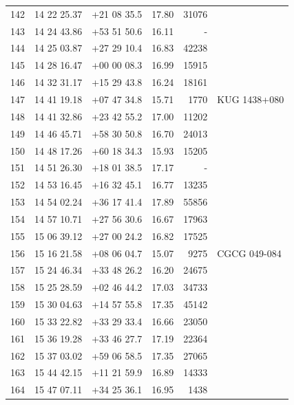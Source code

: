 \documentclass[useAMS,usenatbib]{mn2e}
\begin{document}
\begin{table}
\begin{tabular}{rrrlrl}
 142 &  14 22 25.37 & +21 08 35.5 &  17.80 &  31076 &                  \\
 143 &  14 24 43.86 & +53 51 50.6 &  16.11 &      - &                  \\
 144 &  14 25 03.87 & +27 29 10.4 &  16.83 &  42238 &                  \\
 145 &  14 28 16.47 & +00 00 08.3 &  16.99 &  15915 &                  \\
 146 &  14 32 31.17 & +15 29 43.8 &  16.24 &  18161 &                  \\
 147 &  14 41 19.18 & +07 47 34.8 &  15.71 &   1770 &    KUG 1438+080  \\
 148 &  14 41 32.86 & +23 42 55.2 &  17.00 &  11202 &                  \\
 149 &  14 46 45.71 & +58 30 50.8 &  16.70 &  24013 &                  \\
 150 &  14 48 17.26 & +60 18 34.3 &  15.93 &  15205 &                  \\
 151 &  14 51 26.30 & +18 01 38.5 &  17.17 &     -  &                  \\
 152 &  14 53 16.45 & +16 32 45.1 &  16.77 &  13235 &                  \\
 153 &  14 54 02.24 & +36 17 41.4 &  17.89 &  55856 &                  \\
 154 &  14 57 10.71 & +27 56 30.6 &  16.67 &  17963 &                  \\
 155 &  15 06 39.12 & +27 00 24.2 &  16.82 &  17525 &                  \\
 156 &  15 16 21.58 & +08 06 04.7 &  15.07 &   9275 &      CGCG 049-084\\
 157 &  15 24 46.34 & +33 48 26.2 &  16.20 &  24675 &                  \\
 158 &  15 25 28.59 & +02 46 44.2 &  17.03 &  34733 &                  \\
 159 &  15 30 04.63 & +14 57 55.8 &  17.35 &  45142 &                  \\
 160 &  15 33 22.82 & +33 29 33.4 &  16.66 &  23050 &                  \\
 161 &  15 36 19.28 & +33 46 27.7 &  17.19 &  22364 &                  \\
 162 &  15 37 03.02 & +59 06 58.5 &  17.35 &  27065 &                  \\
 163 &  15 44 42.15 & +11 21 59.9 &  16.89 &  14333 &                  \\
 164 &  15 47 07.11 & +34 25 36.1 &  16.95 &   1438 &                  \\

\end{tabular}
\end{table}
\end{document}
